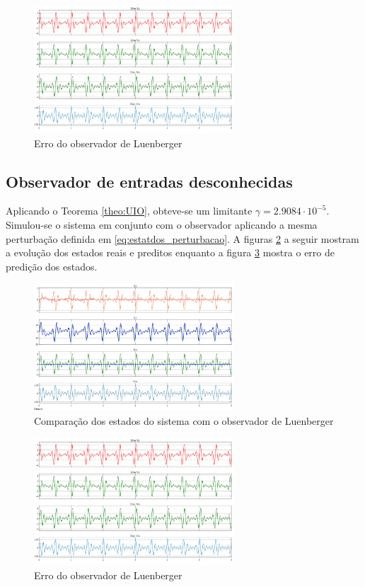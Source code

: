 \FloatBarrier
\begin{figure}[htbp]
    \begin{centering}
    \includegraphics[width=7.5cm]{img/estatdos_erro_luenberg.png} 
    \caption{Erro do observador de Luenberger}
    \label{fig:estatdos_erro_luenberg}
    \end{centering}
\end{figure}
\FloatBarrier

\subsection{Observador de entradas desconhecidas}
Aplicando o Teorema \ref{theo:UIO}, obteve-se um limitante $\gamma=2.9084\cdot10^{-5}$. Simulou-se o sistema em conjunto com o observador aplicando a mesma perturbação definida em \eqref{eq:estatdos_perturbacao}.
A figuras \ref{fig:estatdos_luenberger} a seguir mostram a evolução dos estados reais e preditos enquanto a figura \ref{fig:estatdos_erro_luenberg} mostra o erro de predição dos estados.

\FloatBarrier
\begin{figure}[htbp]
    \begin{centering}
    \includegraphics[width=7.5cm]{img/estatdos_luenberger.png} 
    \caption{Comparação dos estados do sistema com o observador de Luenberger}
    \label{fig:estatdos_luenberger}
    \end{centering}
\end{figure}
\FloatBarrier

\FloatBarrier
\begin{figure}[htbp]
    \begin{centering}
    \includegraphics[width=7.5cm]{img/estatdos_erro_luenberg.png} 
    \caption{Erro do observador de Luenberger}
    \label{fig:estatdos_erro_luenberg}
    \end{centering}
\end{figure}
\FloatBarrier
